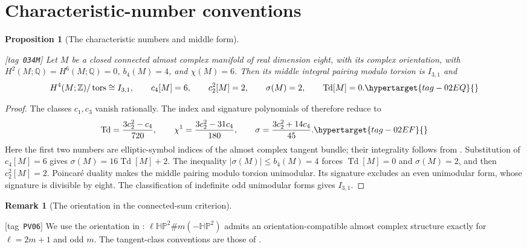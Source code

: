 \documentclass[11pt,a4paper]{article}
\numberwithin{equation}{section}
\newtheorem{proposition}[proposition]{Proposition}
\theoremstyle{definition}
\newtheorem{remark}[remark]{Remark}
\newcommand{\StatementRecord}[4]{{\upshape\footnotesize[tag~\texttt{#3}]}\enspace\ignorespaces}
\begin{document}
\section{Characteristic-number conventions}\label{pub:V:sec-characteristic-conventions}
\begin{proposition}[The characteristic numbers and middle form]
\hypertarget{tag-034M}{}\label{sec:V-known-inputs}
\StatementRecord{sec:V-known-inputs}{proved}{034M}{}
Let $M$ be a closed connected almost complex manifold of real dimension
eight, with its complex orientation, with $H^2(M;\mathbb Q)=
H^6(M;\mathbb Q)=0$, $b_4(M)=4$, and $\chi(M)=6$.
Then its middle integral pairing modulo torsion is $I_{3,1}$ and
\begin{equation}
 H^4(M;\mathbb Z)/\operatorname{tors}\cong I_{3,1},\qquad
 c_4[M]=6,\qquad c_2^2[M]=2,\qquad
 \sigma(M)=2,\qquad\operatorname{Td}[M]=0.
 \hypertarget{tag-02EQ}{}\label{maps:eq:F.2}
\end{equation}
\end{proposition}
\begin{proof}
The classes $c_1,c_3$ vanish rationally. The index and signature
polynomials of \cite[equations~(1.2)--(1.4), pp.~3--4]{ffEsoleKang}
therefore reduce to
\begin{equation}
 \operatorname{Td}=\frac{3c_2^2-c_4}{720},\qquad
 \chi^1=\frac{3c_2^2-31c_4}{180},\qquad
 \sigma=\frac{3c_2^2+14c_4}{45}.
 \hypertarget{tag-02EF}{}\label{maps:eq:F.1}
\end{equation}
Here the first two numbers are elliptic-symbol indices of the
almost complex tangent bundle; their integrality follows from
\cite[Theorem~24.5.4 and its corollary, p.~184]{HirzebruchTopologicalMethods}.
Substitution of $c_4[M]=6$ gives
$\sigma(M)=16\operatorname{Td}[M]+2$.
The inequality $|\sigma(M)|\le b_4(M)=4$ forces
$\operatorname{Td}[M]=0$ and $\sigma(M)=2$, and then $c_2^2[M]=2$.
Poincar\'e duality makes the middle pairing modulo torsion
unimodular. Its signature excludes an even unimodular form,
whose signature is divisible by eight. The classification of
indefinite odd unimodular forms
\cite[Theorem~2.2.1, p.~61]{ffPetersSterk} gives $I_{3,1}$.
\end{proof}

\begin{remark}[The orientation in the connected-sum criterion]
\hypertarget{tag-PV06}{}\label{pub:V:mandal-convention}
\StatementRecord{pub:V:mandal-convention}{proved}{PV06}{}
We use the orientation in
\cite[Corollary~1.4, p.~4, and its proof in \S5]{ffMandal}:
$\ell\mathbb{HP}^2\#m(-\mathbb{HP}^2)$ admits an
orientation-compatible almost complex structure exactly for
$\ell=2m+1$ and odd $m$.
The tangent-class conventions are those of
\cite[Lemma~2.1, p.~5, and Theorem~2.4, p.~7]{ffMandal}.
\end{remark}
\end{document}
